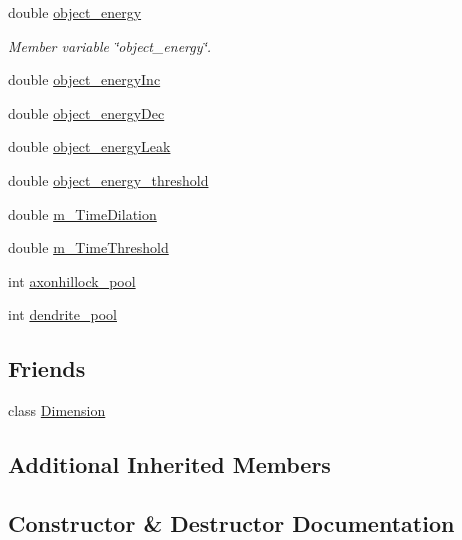 \begin{DoxyCompactItemize}
double \mbox{\hyperlink{classSoma_ac476da0d76368316b374839f60387176}{object\+\_\+energy}}
\begin{DoxyCompactList}\small\item\em Member variable \char`\"{}object\+\_\+energy\char`\"{}. \end{DoxyCompactList}\item 
double \mbox{\hyperlink{classSoma_aa290cae75c0a834fbfe2556ed359a135}{object\+\_\+energy\+Inc}}
\item 
double \mbox{\hyperlink{classSoma_a49345275d3d890f9d3c44e09de5b3c8c}{object\+\_\+energy\+Dec}}
\item 
double \mbox{\hyperlink{classSoma_a7f8941a98528311a249f13ea73f14e3b}{object\+\_\+energy\+Leak}}
\item 
double \mbox{\hyperlink{classSoma_a4a9bab479f79acb47d57b7fb3730fd7d}{object\+\_\+energy\+\_\+threshold}}
\item 
double \mbox{\hyperlink{classSoma_a170d85686c1a30d045c2966df962ba3e}{m\+\_\+\+Time\+Dilation}}
\item 
double \mbox{\hyperlink{classSoma_a1884a12afbda6576f64997ca9c349579}{m\+\_\+\+Time\+Threshold}}
\item 
int \mbox{\hyperlink{classSoma_a57dca929c2579efc29ee9d96bdb1b261}{axonhillock\+\_\+pool}}
\item 
int \mbox{\hyperlink{classSoma_ab9b22d223ef063b3bafb4686893dea33}{dendrite\+\_\+pool}}
\end{DoxyCompactItemize}
\subsection*{Friends}
\begin{DoxyCompactItemize}
\item 
class \mbox{\hyperlink{classSoma_aabae1fdc220bf040d4f5c2c057abfcf5}{Dimension}}
\end{DoxyCompactItemize}
\subsection*{Additional Inherited Members}


\subsection{Constructor \& Destructor Documentation}
\mbox{\label{classSoma_abb9524743f65717d33797b45bff42441}} 
